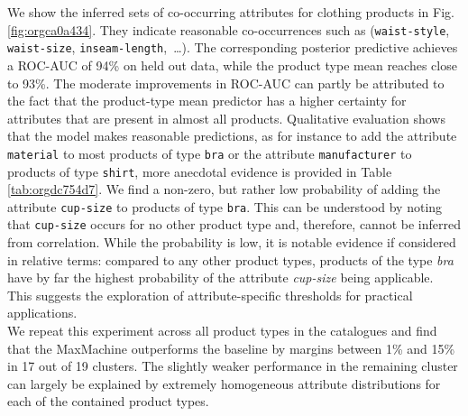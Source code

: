 \documentclass{article}
\begin{document}
We show the inferred sets of co-occurring attributes for clothing
products in Fig.\space{}\ref{fig:orgca0a434}. They indicate reasonable co-occurrences such as (\texttt{waist-style}, \texttt{waist-size}, \texttt{inseam-length},~\ldots).
The corresponding posterior predictive achieves a ROC-AUC of 94\% on held out data, while the product type mean reaches close to 93\%. The
moderate improvements in ROC-AUC can partly be attributed to the
fact that 
the product-type mean predictor has a higher certainty for
attributes that are present in almost all products.
Qualitative evaluation shows that the model makes reasonable
predictions, as for instance to add the attribute \texttt{material} to most
products of type \texttt{bra} or the attribute \texttt{manufacturer} to products of type
\texttt{shirt}, more anecdotal evidence is provided in Table
\ref{tab:orgdc754d7}.
We find a
non-zero, but rather low probability of adding the attribute
\texttt{cup-size} to products of type \texttt{bra}. This can be understood by
noting that \texttt{cup-size} occurs for no other product type and,
therefore, cannot be inferred from correlation. While the probability
is low, it is notable evidence if considered in relative terms:
compared to any other product types, products of the type \emph{bra} have 
by far the highest probability of the attribute \emph{cup-size} being
applicable. This suggests the exploration of attribute-specific
thresholds for practical applications.\\
We repeat this experiment across all product types in the catalogues and find that
the  MaxMachine outperforms the baseline
by margins between 1\% and 15\% in 17 out of 19 clusters. 
The slightly weaker performance in the remaining cluster can largely be explained by extremely homogeneous attribute distributions for each of the contained product types.
\end{document}
